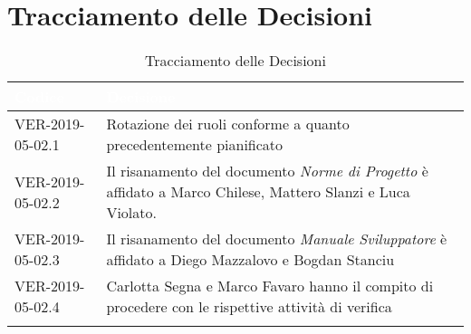 \newpage
\section{Tracciamento delle Decisioni}

\begin{longtable}{|C{.33\textwidth}|C{.61\textwidth}|}
\hline
{}\textbf{\textcolor{white}{Codice}} & \textbf{\textcolor{white}{Decisione}}\\
\hline
VER-2019-05-02.1 & Rotazione dei ruoli conforme a quanto precedentemente pianificato\\
\hline
{}VER-2019-05-02.2 & Il risanamento del documento \textit{Norme di Progetto} è affidato a Marco Chilese, Mattero Slanzi e Luca Violato.\\
\hline
VER-2019-05-02.3 & Il risanamento del documento \textit{Manuale Sviluppatore} è affidato a Diego Mazzalovo e Bogdan Stanciu\\
\hline
{}VER-2019-05-02.4 & Carlotta Segna e Marco Favaro hanno il compito di procedere con le rispettive attività di verifica\\
\hline
\caption{Tracciamento delle Decisioni}
\end{longtable}
